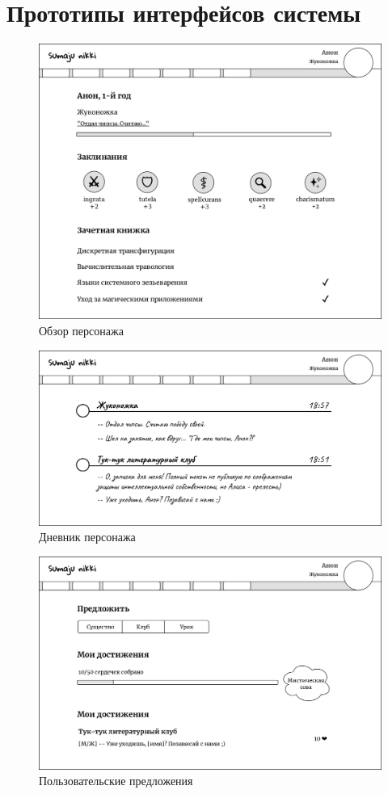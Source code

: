 \documentclass[12pt, a4paper]{article}
\begin{document}
\section{Прототипы интерфейсов системы}

\begin{figure}[H]
  \centering
  \includegraphics[width=15.6cm]{ui-mockup-character.png}
  \caption{Обзор персонажа}
\end{figure}

\begin{figure}[H]
  \centering
  \includegraphics[width=15.6cm]{ui-mockup-diary.png}
  \caption{Дневник персонажа}
\end{figure}

\begin{figure}[H]
  \centering
  \includegraphics[width=15.6cm]{ui-mockup-suggestions.png}
  \caption{Пользовательские предложения}
\end{figure}
\end{document}
